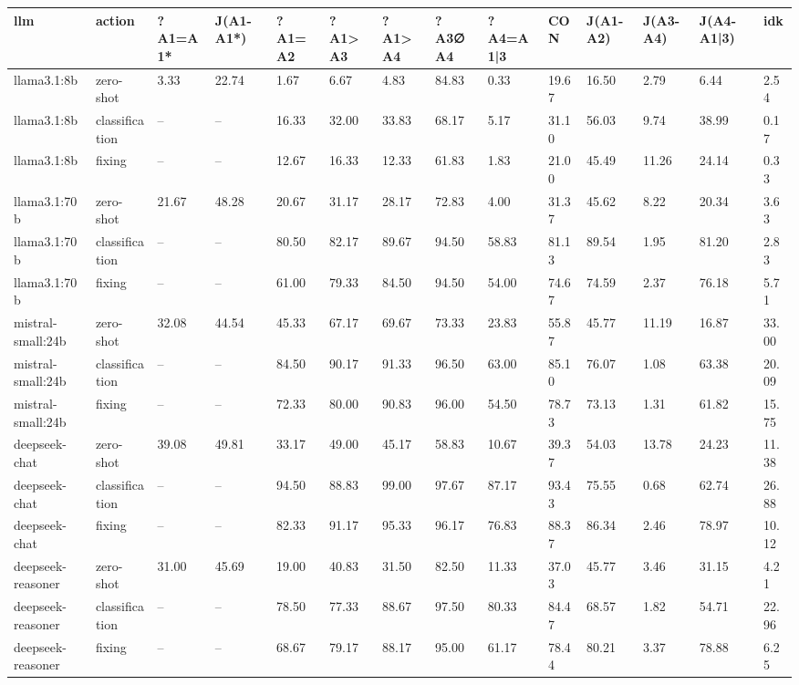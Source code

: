 \begin{table}[!t]
\centering\scriptsize
\begin{tabular}{llllllllllllll}
\toprule
llm & action & ?A1=A1* & J(A1-A1*) & ?A1=A2 & ?A1>A3 & ?A1>A4 & ?A3∅A4 & ?A4=A1|3 & CON & J(A1-A2) & J(A3-A4) & J(A4-A1|3) & idk \\
\midrule
llama3.1:8b & zero-shot & 3.33 & 22.74 & 1.67 & 6.67 & 4.83 & 84.83 & 0.33 & 19.67 & 16.50 & 2.79 & 6.44 & 2.54 \\
llama3.1:8b & classification & -- & -- & 16.33 & 32.00 & 33.83 & 68.17 & 5.17 & 31.10 & 56.03 & 9.74 & 38.99 & 0.17 \\
llama3.1:8b & fixing & -- & -- & 12.67 & 16.33 & 12.33 & 61.83 & 1.83 & 21.00 & 45.49 & 11.26 & 24.14 & 0.33 \\
llama3.1:70b & zero-shot & 21.67 & 48.28 & 20.67 & 31.17 & 28.17 & 72.83 & 4.00 & 31.37 & 45.62 & 8.22 & 20.34 & 3.63 \\
llama3.1:70b & classification & -- & -- & 80.50 & 82.17 & 89.67 & 94.50 & 58.83 & 81.13 & 89.54 & 1.95 & 81.20 & 2.83 \\
llama3.1:70b & fixing & -- & -- & 61.00 & 79.33 & 84.50 & 94.50 & 54.00 & 74.67 & 74.59 & 2.37 & 76.18 & 5.71 \\
mistral-small:24b & zero-shot & 32.08 & 44.54 & 45.33 & 67.17 & 69.67 & 73.33 & 23.83 & 55.87 & 45.77 & 11.19 & 16.87 & 33.00 \\
mistral-small:24b & classification & -- & -- & 84.50 & 90.17 & 91.33 & 96.50 & 63.00 & 85.10 & 76.07 & 1.08 & 63.38 & 20.09 \\
mistral-small:24b & fixing & -- & -- & 72.33 & 80.00 & 90.83 & 96.00 & 54.50 & 78.73 & 73.13 & 1.31 & 61.82 & 15.75 \\
deepseek-chat & zero-shot & 39.08 & 49.81 & 33.17 & 49.00 & 45.17 & 58.83 & 10.67 & 39.37 & 54.03 & 13.78 & 24.23 & 11.38 \\
deepseek-chat & classification & -- & -- & 94.50 & 88.83 & 99.00 & 97.67 & 87.17 & 93.43 & 75.55 & 0.68 & 62.74 & 26.88 \\
deepseek-chat & fixing & -- & -- & 82.33 & 91.17 & 95.33 & 96.17 & 76.83 & 88.37 & 86.34 & 2.46 & 78.97 & 10.12 \\
deepseek-reasoner & zero-shot & 31.00 & 45.69 & 19.00 & 40.83 & 31.50 & 82.50 & 11.33 & 37.03 & 45.77 & 3.46 & 31.15 & 4.21 \\
deepseek-reasoner & classification & -- & -- & 78.50 & 77.33 & 88.67 & 97.50 & 80.33 & 84.47 & 68.57 & 1.82 & 54.71 & 22.96 \\
deepseek-reasoner & fixing & -- & -- & 68.67 & 79.17 & 88.17 & 95.00 & 61.17 & 78.44 & 80.21 & 3.37 & 78.88 & 6.25 \\

\end{tabular}
\end{table}

